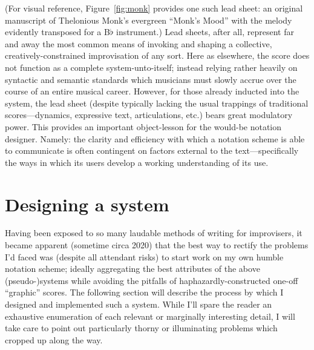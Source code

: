     (For visual reference, Figure~\ref{fig:monk} provides one such lead sheet: an original manuscript of Thelonious Monk's evergreen ``Monk's Mood'' with the melody evidently transposed for a B$\flat$ instrument.) Lead sheets, after all, represent far and away the most common means of invoking and shaping a collective, creatively-constrained improvisation of any sort. Here as elsewhere, the score does not function as a complete system-unto-itself; instead relying rather heavily on syntactic and semantic standards which musicians must slowly accrue over the course of an entire musical career. However, for those already inducted into the system, the lead sheet (despite typically lacking the usual trappings of traditional scores---dynamics, expressive text, articulations, etc.) bears great modulatory power. This provides an important object-lesson for the would-be notation designer. Namely: the clarity and efficiency with which a notation scheme is able to communicate is often contingent on factors external to the text---specifically the ways in which its users develop a working understanding of its use.

\section{Designing a system}

    Having been exposed to so many laudable methods of writing for improvisers, it became apparent (sometime circa 2020) that the best way to rectify the problems I'd faced was (despite all attendant risks) to start work on my own humble notation scheme; ideally aggregating the best attributes of the above (pseudo-)systems while avoiding the pitfalls of haphazardly-constructed one-off ``graphic'' scores. The following section will describe the process by which I designed and implemented such a system. While I'll spare the reader an exhaustive enumeration of each relevant or marginally interesting detail, I will take care to point out particularly thorny or illuminating problems which cropped up along the way.

